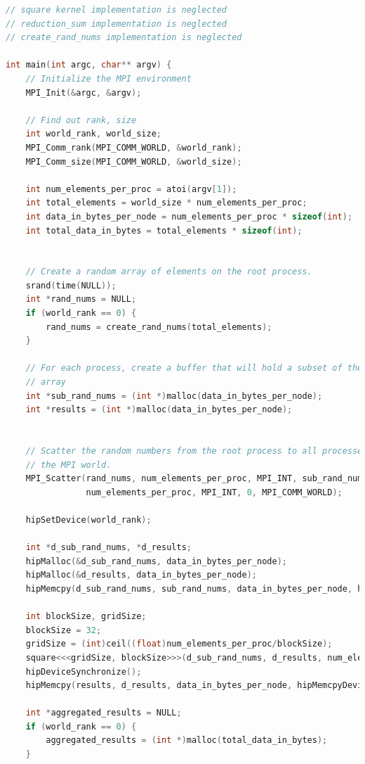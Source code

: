 \begin{lstlisting}[language=C, caption={用MPI設計多GPU程式}, captionpos=t, label={lst:multGPUs_mpi}]
// square kernel implementation is neglected
// reduction_sum implementation is neglected
// create_rand_nums implementation is neglected

int main(int argc, char** argv) {
    // Initialize the MPI environment
    MPI_Init(&argc, &argv);
    
    // Find out rank, size
    int world_rank, world_size;
    MPI_Comm_rank(MPI_COMM_WORLD, &world_rank);
    MPI_Comm_size(MPI_COMM_WORLD, &world_size);
    
    int num_elements_per_proc = atoi(argv[1]);
    int total_elements = world_size * num_elements_per_proc;
    int data_in_bytes_per_node = num_elements_per_proc * sizeof(int);
    int total_data_in_bytes = total_elements * sizeof(int);

    
    // Create a random array of elements on the root process.
    srand(time(NULL));
    int *rand_nums = NULL;
    if (world_rank == 0) {
        rand_nums = create_rand_nums(total_elements);
    }
    
    // For each process, create a buffer that will hold a subset of the
    // array
    int *sub_rand_nums = (int *)malloc(data_in_bytes_per_node);
    int *results = (int *)malloc(data_in_bytes_per_node);

    
    // Scatter the random numbers from the root process to all processes in
    // the MPI world.
    MPI_Scatter(rand_nums, num_elements_per_proc, MPI_INT, sub_rand_nums,
                num_elements_per_proc, MPI_INT, 0, MPI_COMM_WORLD);

    hipSetDevice(world_rank);
    
    int *d_sub_rand_nums, *d_results;
    hipMalloc(&d_sub_rand_nums, data_in_bytes_per_node);
    hipMalloc(&d_results, data_in_bytes_per_node);
    hipMemcpy(d_sub_rand_nums, sub_rand_nums, data_in_bytes_per_node, hipMemcpyHostToDevice);
              
    int blockSize, gridSize;
    blockSize = 32;
    gridSize = (int)ceil((float)num_elements_per_proc/blockSize);
    square<<<gridSize, blockSize>>>(d_sub_rand_nums, d_results, num_elements_per_proc);                 
    hipDeviceSynchronize();
    hipMemcpy(results, d_results, data_in_bytes_per_node, hipMemcpyDeviceToHost);
              
    int *aggregated_results = NULL;
    if (world_rank == 0) {
        aggregated_results = (int *)malloc(total_data_in_bytes);
    }
    

\end{lstlisting}
